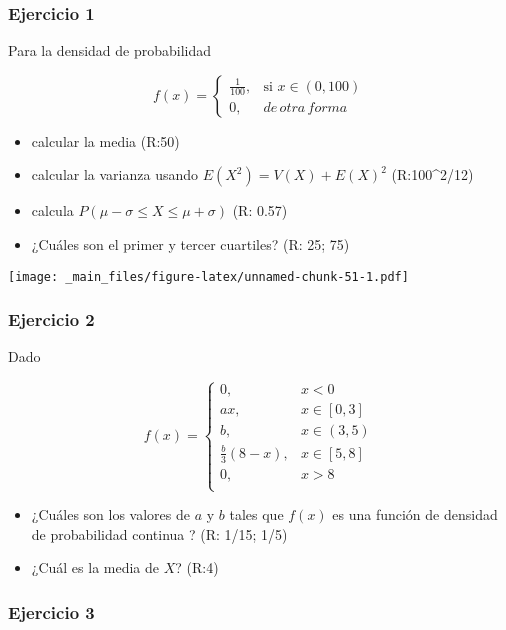 \documentclass[
]{book}
\providecommand{\tightlist}{%
  \setlength{\itemsep}{0pt}\setlength{\parskip}{0pt}}
\begin{document}
\hypertarget{ejercicio-1-3}{%
\subsubsection{Ejercicio 1}\label{ejercicio-1-3}}

Para la densidad de probabilidad

\[
    f(x)= 
\begin{cases}
    \frac{1}{100},& \text{si } x\in (0,100)\\
    0,& de\, otra\, forma 
\end{cases}
\]

\begin{itemize}
\tightlist
\item
  calcular la media (R:50)
\item
  calcular la varianza usando \(E(X^2)= V(X)+E(X)^2\) (R:100\^{}2/12)
\item
  calcula \(P( \mu-\sigma \leq X \leq \mu+\sigma)\) (R: 0.57)
\item
  ¿Cuáles son el primer y tercer cuartiles? (R: 25; 75)
\end{itemize}

\texttt{[image: \_main\_files/figure-latex/unnamed-chunk-51-1.pdf]}

\hypertarget{ejercicio-2-3}{%
\subsubsection{Ejercicio 2}\label{ejercicio-2-3}}

Dado

\[
    f(x)= 
\begin{cases}
0, & x < 0 \\
ax, & x \in [0,3] \\
b, & x \in (3,5) \\
\frac{b}{3}(8-x),& x \in [5,8]\\
0, & x > 8 \\
\end{cases}
\]

\begin{itemize}
\item
  ¿Cuáles son los valores de \(a\) y \(b\) tales que \(f(x)\) es una función de densidad de probabilidad continua ? (R: 1/15; 1/5)
\item
  ¿Cuál es la media de \(X\)? (R:4)
\end{itemize}

\hypertarget{ejercicio-3-3}{%
\subsubsection{Ejercicio 3}\label{ejercicio-3-3}}
\end{document}
